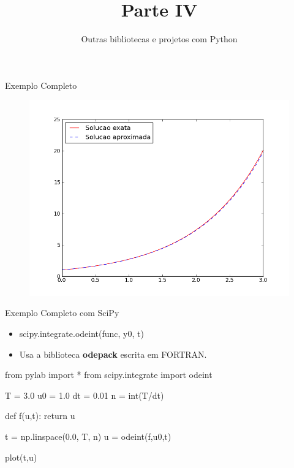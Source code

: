 \documentclass[12pt,t,graphics]{beamer}
\begin{document}
\begin{frame}[t,fragile]{Exemplo Completo}
	\vspace{-0.5cm}
	\begin{figure}
		\centering
		\includegraphics[scale=0.45]{img/euler.png}
	\end{figure}
\end{frame}

\begin{frame}[t,fragile]{Exemplo Completo com SciPy}
	\begin{itemize}
		\item scipy.integrate.odeint(func, y0, t)
		\item Usa a biblioteca \textbf{odepack} escrita em FORTRAN.
	\end{itemize}
	\begin{python}[]
	from pylab import *
	from scipy.integrate import odeint
	
	T  = 3.0
	u0 = 1.0
	dt = 0.01
	n  = int(T/dt)
	
	def f(u,t):
	return u
	
	t = np.linspace(0.0, T, n)
	u = odeint(f,u0,t)
	
	plot(t,u)
	\end{python}
\end{frame}


\begin{frame}
	\title{Parte IV}
	\subtitle{Outras bibliotecas e projetos com Python}
	\date{}\author{}\institute{}\date{}
	\maketitle
\end{frame}
\end{document}
